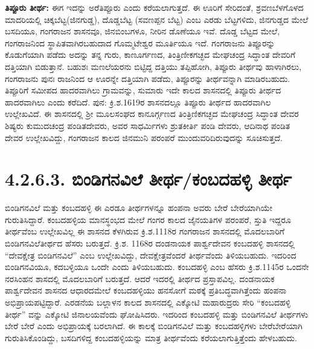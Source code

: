 \textbf{ತಿಪ್ಪೂರು ತೀರ್ಥ:} ಈಗ ಇದನ್ನು ಅರೆತಿಪ್ಪೂರು ಎಂದು ಕರೆಯಲಾಗುತ್ತದೆ. ಈ ಊರಿಗೆ ಸೇರಿದಂತೆ, ಶ್ರವಣಬೆಳಗೊಳದ ಮಾದರಿಯಲ್ಲಿ ಚಿಕ್ಕಬೆಟ್ಟ(ಜಿನಗುಡ್ಡ), ದೊಡ್ಡಬೆಟ್ಟ (ಸವಣಪ್ಪನ ಬೆಟ್ಟ) ಎಂಬ ಎರಡು ಬೆಟ್ಟಗಳಿದು, ಜಿನಗುಡ್ಡದ ಮೇಲೆ ಬಸದಿಯೂ, ಗಂಗರಾಜನ ಶಾಸನವೂ, ಜಿನಬಿಂಬಗಳೂ, ನೀರಿನ ಡೊಣೆಯೂ ಇವೆ. ದೊಡ್ಡ ಬೆಟ್ಟದ ಮೇಲೆ, ಗಂಗರಾಜನಿಂದ ಸ್ಥಾಪಿತವಾಗಿರಬಹುದಾದ ಗೊಮ್ಮಟೇಶ್ವರ ಮೂರ್ತಿಯೂ ಇದೆ. ಗಂಗರಾಜನು ತಿಪ್ಪೂರನ್ನು ಕೊಡುಗೆಯಾಗಿ ಪಡೆದು ಅದನ್ನು ತನ್ನ ಗುರು, ಕಾಣೂರ್ಗಣದ, ತಿಂತ್ರಿಣೀಕಗಚ್ಛದ ಮೇಘಚಂದ್ರ ಸಿದ್ಧಾಂತ ದೇವರಿಗೆ ದತ್ತಿಯಾಗಿ ಬಿಡುತ್ತಾನೆ. ಬಹುಶಃ ಮಣಲೆಯರನು ಬಿಟ್ಟಿದ್ದ ದತ್ತಿಯು ತಪ್ಪಿಹೋಗಿ, ತಿಪ್ಪೂರು ತೀರ್ಥವು ಹಾಳಾಗಿರಲು, ಗಂಗರಾಜನು ಪುನಃ ರಾಜನಿಂದ ಆ ಊರನ್ನೇ ದತ್ತಿಯಾಗಿ ಪಡೆದು, ತಿಪ್ಪೂರನ್ನು ತೀರ್ಥವನ್ನಾಗಿ ಮಾಡಿರಬಹುದು. ತಿಪ್ಪೂರಿಗೆ ಸಮೀಪದ ಹಾದರವಾಗಿಲು ಗ್ರಾಮವನ್ನು, ಸುಮಾರು ಇದೇ ಕಾಲದ ಶಾಸನದಲ್ಲಿ ತಿಪ್ಪೂರು ತೀರ್ಥದ ಹಾದರವಾಗಿಲು ಎಂದು ಕರೆದಿದೆ. ಪುನ: ಕ್ರಿ.ಶ.1619ರ ಶಾಸನದಲ್ಲೂ ತಿಪ್ಪೂರು ತೀರ್ಥದ ಹಾದರವಾಗಿಲ ಉಲ್ಲೇಖವಿದೆ. ಈ ಶಾಸನದಲ್ಲಿ ಶ‍್ರೀ ಮೂಲಸಂಘದ ಕಾನೂರ್ಗ್ಗಣದ ತಿಂತ್ರಿಣಿಕಗಚ್ಛದ ಮೇಘಚಂದ್ರ ಸಿದ್ಧಾಂತ ದೇವರ ಶಿಷ್ಯರು ಕುಮುದಚಂದ್ರ ಪಂಡಿತದೇವರು, ಅವರ ಸಾಧರ್ಮಿಗಳು ಶ್ರುತಕೀರ್ತಿ ಪಂಡಿ ದೇವರು, ಆದಿನಾಥ ಪಂಡಿತ ದೇವರ ಉಲ್ಲೇಖವಿದ್ದು, ಗಂಗರಾಜನ ಕಾಲದ ಜಿನಮುನಿ ಪರಂಪರೆ ಮುಂದುವರಿದಿರುವುದನ್ನು ಸೂಚಿಸುತ್ತದೆ.


\section{4.2.6.3. ಬಿಂಡಿಗನವಿಲೆ ತೀರ್ಥ/ಕಂಬದಹಳ್ಳಿ ತೀರ್ಥ}

ಬಿಂಡಿಗನವಿಲೆ ಮತ್ತು ಕಂಬದಹಳ್ಳಿ ಈ ಎರಡೂ ತೀರ್ಥಗಳನ್ನೂ ಹಂಪನಾ ಅವರು ಬೇರೆ ಬೇರೆಯಾಗಿಯೇ ಗುರುತಿಸಿದ್ದಾರೆ. ಕಂಬದಹಳ್ಳಿಯ ಮಾನಸ್ಥಂಭದ ಮೇಲೆ ಗಂಗರ ಕಾಲದ ಜೈನಯತಿಗಳ ಪರಂಪರೆ, ಸ್ತುತಿ ಇದ್ದರೂ ತೀರ್ಥವೆಂಬ ಉಲ್ಲೇಖವಿಲ್ಲ ಈ ಶಾಸನದ ಕೆಳಗಿರುವ ಕ್ರಿ.ಶ.1118ರ ಗಂಗರಾಜನ ಶಾಸನದಲ್ಲಿ ಮೊದಲಬಾರಿಗೆ ಬಿಂಡಿಗನವಿಲೆತೀರ್ಥದ ಹೆಸರು ಬರುತ್ತದೆ. ಕ್ರಿ.ಶ. 1168ರ ದಂಡನಾಯಕ ಪಾರ್ಶ್ವದೇವನ ಕಂಬದಹಳ್ಳಿ ಶಾಸನದಲ್ಲಿ “ದೇವಕ್ಷೇತ್ರ ಬಿಂಡಿಗನವಿಲೆ” ಎಂಬ ಉಲ್ಲೇಖವಿದ್ದು, ದೇವಕ್ಷೇತ್ರವೆಂದರೆ ತೀರ್ಥವೆಂದು ತಿಳಿಯಬಹುದು. ಇದರಿಂದ ಬಿಂಡಿಗನವಿಯೂ, ಕದಬಳ್ಳಿಯೂ ಒಂದೇ ಎಂದು ತಿಳಿಯಬಹುದು. ಕಂಬದಹಳ್ಳಿ ಎಂಬ ಹೆಸರು ಕ್ರಿ.ಶ.1145ರ ಒಂದನೇ ನರಸಿಂಹನ ಶಾಸದಲ್ಲಿ ಮೊದಲಬಾರಿಗೆ ಬರುತ್ತದೆ. ಆದರೆ ಇದರಲ್ಲಿ ತೀರ್ಥದ ಪ್ರಸ್ತಾಪವಿಲ್ಲ. ದಂಡನಾಯಕ ಪಾರ್ಶ್ವದೇವನ ಶಾಸನದ ಆಧಾರದಮೇಲೆ ಕಂಬದಹಳ್ಳಿಯು ಹನಸೋಗೆ ಮಠಕ್ಕೆ ಪ್ರತಿಬದ್ಧವಾಗಿತ್ತೆಂದು ಹಂಪನಾ ಅಭಿಪ್ರಾಯಪಟ್ಟಿದ್ದಾರೆ. ಎರಡನೆಯ ಬಲ್ಲಾಳನ ಕಾಲದ ಶಾಸನದಲ್ಲಿ ಎಕ್ಕೋಟಿ ಮಹಾರುದ್ರರು ಸೇರಿ “ಕಂಬದಹಳ್ಳಿ ತೀರ್ಥ” ವನ್ನು ಎಕ್ಕೋಟಿ ಜಿನಾಲಯವೆಂದು ಘೋಷಿಸಿದರು. ಇದರಿಂದ ಕಂಬದಹಳ್ಳಿ ಮತ್ತು ಬಿಂಡಿಗನವಿಲೆ ತೀರ್ಥಗಳು ಬೇರೆ ಬೇರೆ ಎಂದು ಅಭಿಪ್ರಾಯಕ್ಕೆ ಬರಲಾಗಿದೆ. ಈ ಕಾಲಕ್ಕೆ ಬಿಂಡಿಗನವಿಲೆ ಮತ್ತು ಕಂಬದಹಳ್ಳಿಗಳು ಬೇರೆಬೇರೆಯಾಗಿ ಗುರುತಿಸಿಕೊಂಡಿದ್ದು, ಬಸದಿಗಳಿದ್ದ ಕಂಬದಹಳ್ಳಿಯನ್ನು ಮಾತ್ರ ತೀರ್ಥವೆಂದು ಕರೆಯಲಾಗುತ್ತಿತ್ತೆಂದು ಹೇಳಬಹುದು.



